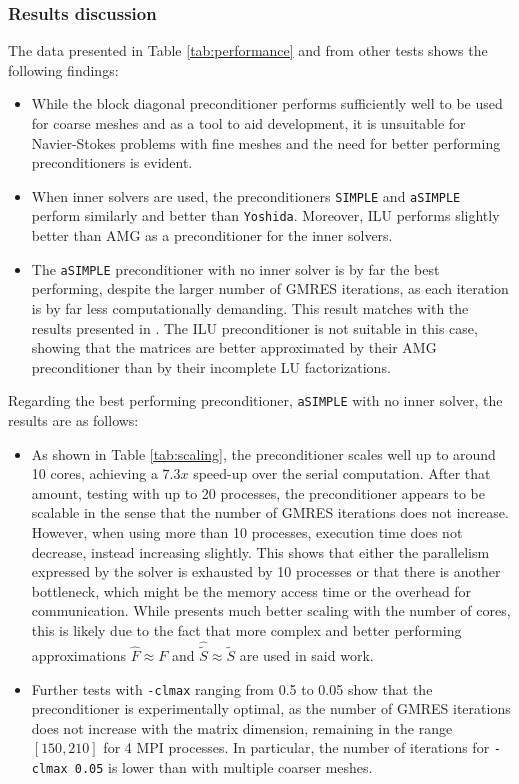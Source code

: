 \subsubsection{Results discussion}
The data presented in Table \ref{tab:performance} and from other tests shows the following findings:
\begin{itemize}
    \item While the block diagonal preconditioner performs sufficiently well to be used for coarse meshes and as a tool to aid development, it is unsuitable for Navier-Stokes problems with fine meshes and the need for better performing preconditioners is evident.
    \item When inner solvers are used, the preconditioners \texttt{SIMPLE} and \texttt{aSIMPLE} perform similarly and better than \texttt{Yoshida}. Moreover, ILU performs slightly better than AMG as a preconditioner for the inner solvers.
    \item The \texttt{aSIMPLE} preconditioner with no inner solver is by far the best performing, despite the larger number of GMRES iterations, as each iteration is by far less computationally demanding. This result matches with the results presented in \cite{Quarteroni}. The ILU preconditioner is not suitable in this case, showing that the matrices are better approximated by their AMG preconditioner than by their incomplete LU factorizations.
\end{itemize}
Regarding the best performing preconditioner, \texttt{aSIMPLE} with no inner solver, the results are as follows:
\begin{itemize}
    \item As shown in Table \ref{tab:scaling}, the preconditioner scales well up to around 10 cores, achieving a $7.3x$ speed-up over the serial computation. After that amount, testing with up to 20 processes, the preconditioner appears to be scalable in the sense that the number of GMRES iterations does not increase. However, when using more than 10 processes, execution time does not decrease, instead increasing slightly. This shows that either the parallelism expressed by the solver is exhausted by 10 processes or that there is another bottleneck, which might be the memory access time or the overhead for communication. While \cite{Quarteroni} presents much better scaling with the number of cores, this is likely due to the fact that more complex and better performing approximations $\hat{F} \approx F$ and $\hat{\tilde{S}} \approx \tilde{S}$ are used in said work.
    \item Further tests with \texttt{-clmax} ranging from 0.5 to 0.05 show that the preconditioner is experimentally optimal, as the number of GMRES iterations does not increase with the matrix dimension, remaining in the range $[150, 210]$ for 4 MPI processes. In particular, the number of iterations for \texttt{-clmax 0.05} is lower than with multiple coarser meshes.
\end{itemize}